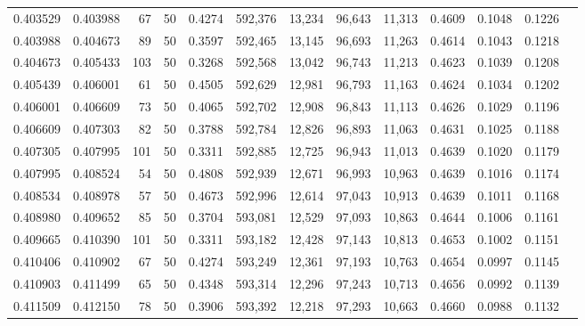 \begin{tabular}{rrrrrrrrrrrrr}
0.403529 & 0.403988 &    67 &  50 &                                     0.4274 & 592,376 &  13,234 &  96,643 &  11,313 & 0.4609 & 0.1048 & 0.1226 \\
0.403988 & 0.404673 &    89 &  50 &                                     0.3597 & 592,465 &  13,145 &  96,693 &  11,263 & 0.4614 & 0.1043 & 0.1218 \\
0.404673 & 0.405433 &   103 &  50 &                                     0.3268 & 592,568 &  13,042 &  96,743 &  11,213 & 0.4623 & 0.1039 & 0.1208 \\
0.405439 & 0.406001 &    61 &  50 &                                     0.4505 & 592,629 &  12,981 &  96,793 &  11,163 & 0.4624 & 0.1034 & 0.1202 \\
0.406001 & 0.406609 &    73 &  50 &                                     0.4065 & 592,702 &  12,908 &  96,843 &  11,113 & 0.4626 & 0.1029 & 0.1196 \\
0.406609 & 0.407303 &    82 &  50 &                                     0.3788 & 592,784 &  12,826 &  96,893 &  11,063 & 0.4631 & 0.1025 & 0.1188 \\
0.407305 & 0.407995 &   101 &  50 &                                     0.3311 & 592,885 &  12,725 &  96,943 &  11,013 & 0.4639 & 0.1020 & 0.1179 \\
0.407995 & 0.408524 &    54 &  50 &                                     0.4808 & 592,939 &  12,671 &  96,993 &  10,963 & 0.4639 & 0.1016 & 0.1174 \\
0.408534 & 0.408978 &    57 &  50 &                                     0.4673 & 592,996 &  12,614 &  97,043 &  10,913 & 0.4639 & 0.1011 & 0.1168 \\
0.408980 & 0.409652 &    85 &  50 &                                     0.3704 & 593,081 &  12,529 &  97,093 &  10,863 & 0.4644 & 0.1006 & 0.1161 \\
0.409665 & 0.410390 &   101 &  50 &                                     0.3311 & 593,182 &  12,428 &  97,143 &  10,813 & 0.4653 & 0.1002 & 0.1151 \\
0.410406 & 0.410902 &    67 &  50 &                                     0.4274 & 593,249 &  12,361 &  97,193 &  10,763 & 0.4654 & 0.0997 & 0.1145 \\
0.410903 & 0.411499 &    65 &  50 &                                     0.4348 & 593,314 &  12,296 &  97,243 &  10,713 & 0.4656 & 0.0992 & 0.1139 \\
0.411509 & 0.412150 &    78 &  50 &                                     0.3906 & 593,392 &  12,218 &  97,293 &  10,663 & 0.4660 & 0.0988 & 0.1132 \\

\end{tabular}
